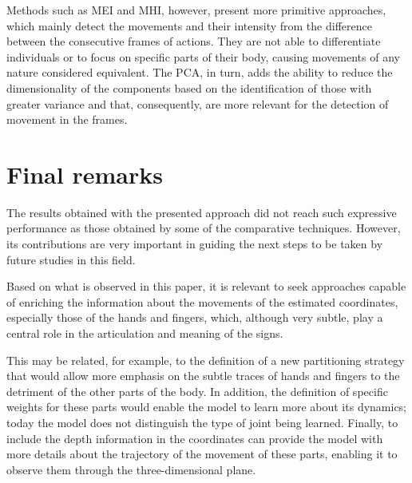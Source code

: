 Methods such as MEI and MHI, however, present more primitive approaches, which mainly detect the movements and their intensity from the difference between the consecutive frames of actions. They are not able to differentiate individuals or to focus on specific parts of their body, causing movements of any nature considered equivalent. The PCA, in turn, adds the ability to reduce the dimensionality of the components based on the identification of those with greater variance and that, consequently, are more relevant for the detection of movement in the frames.

\section{Final remarks} 
\label{sec:final-remarks}

The results obtained with the presented approach did not reach such expressive performance as those obtained by some of the comparative techniques. However, its contributions are very important in guiding the next steps to be taken by future studies in this field.

Based on what is observed in this paper, it is relevant to seek approaches capable of enriching the information about the movements of the estimated coordinates, especially those of the hands and fingers, which, although very subtle, play a central role in the articulation and meaning of the signs.

This may be related, for example, to the definition of a new partitioning strategy that would allow more emphasis on the subtle traces of hands and fingers to the detriment of the other parts of the body. In addition, the definition of specific weights for these parts would enable the model to learn more about its dynamics; today the model does not distinguish the type of joint being learned. Finally, to include the depth information in the coordinates can provide the model with more details about the trajectory of the movement of these parts, enabling it to observe them through the three-dimensional plane.